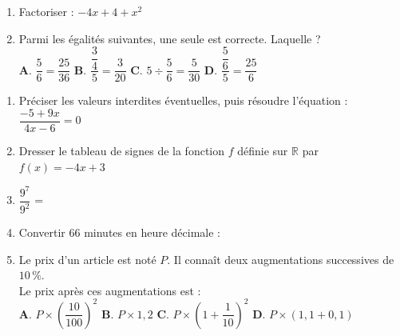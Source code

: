 \documentclass[a4paper,11pt]{article}
\begin{document}
\begin{seanceD}{}
\begin{enumerate}
\begin{center}
\begin{tikzpicture}[baseline,scale = 0.75]
\end{tikzpicture}
\end{center}



\item Factoriser : $-4x+4+x^2$ \dotfill

\item Parmi les égalités suivantes, une seule est correcte. Laquelle ? \\[1em]
\textbf{A}. $\dfrac{5}{6}=\dfrac{25}{36}$ \quad \textbf{B}. $\dfrac{\dfrac{3}{4}}{5}= \dfrac{3}{20}$ \quad \textbf{C}. $5\div \dfrac{5}{6}=\dfrac{5}{30}$ \quad \textbf{D}. $\dfrac{\dfrac{5}{6}}{5}=\dfrac{25}{6}$



\end{enumerate}

\end{seanceD}



\newpage


\begin{seance}{} %

\begin{enumerate}
\item Préciser les valeurs interdites éventuelles, puis résoudre l'équation : $\dfrac{-5+9x}{4x-6}=0$ \dotfill

\dotfill

\dotfill

\item Dresser le tableau de signes de la fonction $f$ définie sur $\mathbb R$ par $f(x)=-4x+3$

\vspace*{1.5cm}

\item $\dfrac{9^{7}}{9^{2}}$ = \dotfill

\item Convertir $66$ minutes en heure décimale : \dotfill

\item Le prix d'un article est noté $P$. Il connaît deux augmentations successives de $10\,\%$. \\
Le prix après ces augmentations est : \\
\textbf{A}. $P \times \left(\dfrac{10}{100}\right)^2$ \quad \textbf{B}. $P \times 1{,}2$ \quad \textbf{C}. $P \times \left(1 + \dfrac{1}{10}\right)^2$ \quad \textbf{D}. $P \times \left(1{,}1 + 0{,}1\right)$



\end{enumerate}

\end{seance}
\end{document}
